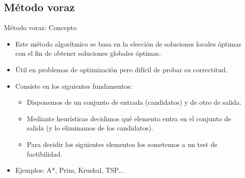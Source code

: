 \documentclass[10pt]{beamer}
\begin{document}
\subsection{Método voraz}
\begin{frame}{Método voraz: Concepto}
  \begin{itemize}
  \item Este método algorítmico se basa en la elección de soluciones locales óptimas
    con el fin de obtener soluciones globales óptimas. \pause
  \item Útil en problemas de optimización pero difícil de probar su correctitud. \pause
  \item Consiste en los siguientes fundamentos: \pause
    \begin{itemize}
    \item Disponemos de un conjunto de entrada (candidatos) y de otro de salida. \pause
    \item Mediante heurísticas decidimos qué elemento entra en el conjunto de salida
      (y lo eliminamos de los candidatos). \pause
    \item Para decidir los siguientes elementos los sometemos a un test de factibilidad. \pause
    \end{itemize}
  \item Ejemplos: A*, Prim, Kruskal, TSP...
  \end{itemize}
\end{frame}
\end{document}
